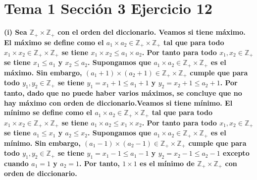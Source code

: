 \documentclass{article}
\begin{document}
\section{Tema 1 Sección 3 Ejercicio 12}
\bf (i) \rm  Sea \(\mathbb{Z}_{+}\times \mathbb{Z}_{+}\) con el orden del diccionario. Veamos si tiene máximo. El máximo se define como el \(a_1\times a_2 \in \mathbb{Z}_{+}\times \mathbb{Z}_{+}\) tal que para todo \(x_1\times x_2\in \mathbb{Z}_{+}\times \mathbb{Z}_{+}\) se tiene \(x_1\times x_2 \leq a_1\times a_2\). Por tanto para todo \(x_1, x_2 \in \mathbb{Z}_{+}\) se tiene \(x_1\leq a_1\) y \(x_2\leq a_2\). Supongamos que \(a_1\times a_2 \in \mathbb{Z}_{+} \times \mathbb{Z}_{+} \) es el máximo. Sin embargo, \((a_1+1)\times (a_2 +1)\in \mathbb{Z}_{+} \times \mathbb{Z}_{+} \) cumple que para todo \(y_1, y_2 \in \mathbb{Z}_{+}\) se tiene \(y_1=x_1+1\leq a_1+1\) y \(y_2=x_2+1\leq a_2+1\). Por tanto, dado que no puede haber varios máximos, se concluye que no hay máximo con orden de diccionario.Veamos si tiene mínimo. El mínimo se define como el \(a_1\times a_2 \in \mathbb{Z}_{+}\times \mathbb{Z}_{+}\) tal que para todo \(x_1\times x_2\in \mathbb{Z}_{+}\times \mathbb{Z}_{+}\) se tiene \(a_1\times a_2 \leq x_1\times x_2\). Por tanto para todo \(x_1, x_2 \in \mathbb{Z}_{+}\) se tiene \(a_1\leq x_1\) y \(a_2\leq x_2\). Supongamos que \(a_1\times a_2 \in \mathbb{Z}_{+} \times \mathbb{Z}_{+} \) es el mínimo. Sin embargo, \((a_1-1)\times (a_2 -1)\in \mathbb{Z}_{+} \times \mathbb{Z}_{+} \) cumple que para todo \(y_1, y_2 \in \mathbb{Z}_{+}\) se tiene \(y_1=x_1-1\leq a_1-1\) y \(y_2=x_2-1\leq a_2-1\) excepto cuando \(a_1=1\) y \(a_2=1\). Por tanto, \(1\times 1\) es el mínimo  de \(\mathbb{Z}_{+} \times \mathbb{Z}_{+}\) con orden de diccionario.
\newline
\end{document}
